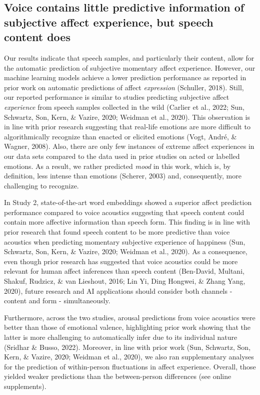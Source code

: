 \documentclass[
  english,
  man,floatsintext]{apa6}
\begin{document}
\hypertarget{voice-contains-little-predictive-information-of-subjective-affect-experience-but-speech-content-does}{%
\subsection{Voice contains little predictive information of subjective affect experience, but speech content does}\label{voice-contains-little-predictive-information-of-subjective-affect-experience-but-speech-content-does}}

Our results indicate that speech samples, and particularly their content, allow for the automatic prediction of subjective momentary affect experience. However, our machine learning models achieve a lower prediction performance as reported in prior work on automatic predictions of affect \emph{expression} (Schuller, 2018). Still, our reported performance is similar to studies predicting subjective affect \emph{experience} from speech samples collected in the wild (Carlier et al., 2022; Sun, Schwartz, Son, Kern, \& Vazire, 2020; Weidman et al., 2020). This observation is in line with prior research suggesting that real-life emotions are more difficult to algorithmically recognize than enacted or elicited emotions (Vogt, André, \& Wagner, 2008). Also, there are only few instances of extreme affect experiences in our data sets compared to the data used in prior studies on acted or labelled emotions. As a result, we rather predicted \emph{mood} in this work, which is, by definition, less intense than emotions (Scherer, 2003) and, consequently, more challenging to recognize.

In Study 2, state-of-the-art word embeddings showed a superior affect prediction performance compared to voice acoustics suggesting that speech content could contain more affective information than speech form. This finding is in line with prior research that found speech content to be more predictive than voice acoustics when predicting momentary subjective experience of happiness (Sun, Schwartz, Son, Kern, \& Vazire, 2020; Weidman et al., 2020). As a consequence, even though prior research has suggested that voice acoustics could be more relevant for human affect inferences than speech content (Ben-David, Multani, Shakuf, Rudzicz, \& van Lieshout, 2016; Lin Yi, Ding Hongwei, \& Zhang Yang, 2020), future research and AI applications should consider both channels - content and form - simultaneously.

Furthermore, across the two studies, arousal predictions from voice acoustics were better than those of emotional valence, highlighting prior work showing that the latter is more challenging to automatically infer due to its individual nature (Sridhar \& Busso, 2022). Moreover, in line with prior work (Sun, Schwartz, Son, Kern, \& Vazire, 2020; Weidman et al., 2020), we also ran supplementary analyses for the prediction of within-person fluctuations in affect experience. Overall, those yielded weaker predictions than the between-person differences (see online supplements).
\end{document}
